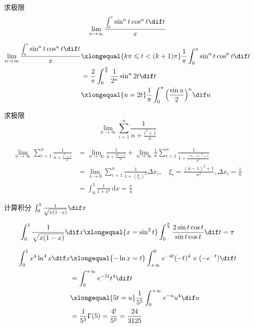 \documentclass[color=green,titlestyle=hang]{elegantbook}%
\begin{document}
\begin{example}
求极限\[\lim_{n\to\infty}\frac{\scaleobj{0.75}{\displaystyle\int_0^x}\sin^nt\cos^nt\dif t}{x}\]
\end{example}\begin{solution}
\begin{align*}
\lim_{n\to\infty}\frac{\scaleobj{0.75}{\displaystyle\int_0^x}\sin^nt\cos^nt\dif t}{x}
&\xlongequal{k\pi\leqslant t<(k+1)\pi}\frac{1}{\pi}\int_0^\pi\sin^nt\cos^nt\dif t\\
&=\frac{2}{\pi}\int_0^{\frac{\pi}{2}}\frac{1}{2^n}\sin^n2t\dif t\\
&\xlongequal{u=2t}\frac{1}{\pi}\int_0^\pi\Big(\frac{\sin u}{2}\Big)^n\dif u
\end{align*}
\end{solution}

\begin{exercise}
求极限\begin{equation*}\lim_{n\to\infty}\sum_{i=1}^{n}\frac{1}{n+\frac{i^2+1}{n}}\end{equation*}
\end{exercise}
\begin{solution}
\begin{align*}
\lim_{n\to\infty}\sum_{i=1}^{n}\frac{1}{n+\frac{i^2+1}{n}}&=\lim_{n\to\infty}\frac{1}{n+\frac{n^2+1}{n}}+\lim_{n\to\infty}\frac{1}{n}\sum_{i=1}^{n}\frac{1}{1+\frac{(n-1)^2+1}{n^2}}\\
&=\lim_{\lambda\to0}\sum_{i=1}^{n}\frac{1}{1+(\xi_i)^2}\Delta x_i,\quad\xi_i=\frac{(n-1)^2+1}{n^2},\Delta x_i=\frac{1}{n}\\
&=\int_0^1\frac{1}{1+x^2}\,\mathrm{d}x=\frac{\pi}{4}
\end{align*}	
\end{solution}

\begin{example}
计算积分 $\int_{0}^{1}\frac{1}{\sqrt{x(1-x)}}\dif x$
\end{example}\begin{solution}
\[\int_{0}^{1}\frac{1}{\sqrt{x(1-x)}}\dif x\xlongequal{x=\sin^2t}\int_{0}^{\frac{\pi}{2}}\frac{2\sin t\cos t}{\sin t\cos t}\dif t=\pi\]
\end{solution}

\begin{align*}
\int_0^1x^4\ln^4x\dif x
&\xlongequal{-\ln x=t}\int_{+\infty}^0e^{-4t}(-t)^4\times(-e^{-t})\dif  t\\
&=\int_0^{+\infty}e^{-5t}t^4\dif  t\\
&\xlongequal{5t=u}\frac{1}{5^5}\int_0^{+\infty}e^{-u}u^4\dif  u\\
&=\frac{1}{5^5}\Gamma(5)=\frac{4!}{5^5}=\frac{24}{3125}
\end{align*}
\end{document}
